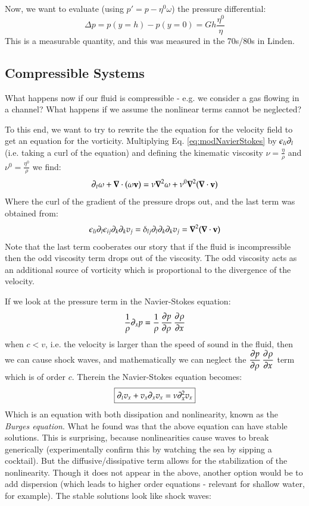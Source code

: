 Now, we want to evaluate (using $p' = p - \eta^0 \omega$) the pressure differential:
\begin{equation}
    \Delta p = p(y=h) - p(y=0) = Gh\frac{\eta^0}{\eta}
\end{equation}
This is a measurable quantity, and this was measured in the 70s/80s in Linden.

\subsection{Compressible Systems}
What happens now if our fluid is compressible - e.g. we consider a gas flowing in a channel? What happens if we assume the nonlinear terms cannot be neglected?

To this end, we want to try to rewrite the the equation for the velocity field to get an equation for the vorticity. Multiplying Eq. \eqref{eq:modNavierStokes} by $\epsilon_{li}\partial_l$ (i.e. taking a curl of the equation) and defining the kinematic viscosity $\nu = \frac{\eta}{\rho}$ and $\nu^0 = \frac{\eta^0}{\rho}$ we find:
\begin{equation}
    \p_t \omega + \nabla \cdot (\omega \v{v}) = \nu \nabla^2 \omega + \nu^0\nabla^2(\nabla \cdot \v{v})
\end{equation}
Where the curl of the gradient of the pressure drops out, and the last term was obtained from:
\begin{equation}
    \e_{li}\p_l \e_{ij}\p_k\p_k v_j = \delta_{lj}\p_l \p_k \p_k v_j = \nabla^2 (\nabla \cdot \v{v})
\end{equation}
Note that the last term cooberates our story that if the fluid is incompressible then the odd viscosity term drops out of the viscosity. The odd viscosity acts as an additional source of vorticity which is proportional to the divergence of the velocity.


If we look at the pressure term in the Navier-Stokes equation:
\begin{equation}
    \frac{1}{\rho}\p_x p = \frac{1}{\rho}\dpd{p}{\rho}\dpd{\rho}{x}
\end{equation}
when $c < v$, i.e. the velocity is larger than the speed of sound in the fluid, then we can cause shock waves, and mathematically we can neglect the $\dpd{p}{\rho}\dpd{\rho}{x}$ term which is of order $c$. Therein the Navier-Stokes equation becomes:
\begin{equation}
    \boxed{\partial_t v_x + v_x \partial_x v_x = \nu \partial_x^2 v_x}
\end{equation}
Which is an equation with both dissipation and nonlinearity, known as the \emph{Burges equation}. What he found was that the above equation can have stable solutions. This is surprising, because nonlinearities cause waves to break generically (experimentally confirm this by watching the sea by sipping a cocktail). But the diffusive/dissipative term allows for the stabilization of the nonlinearity. Though it does not appear in the above, another option would be to add dispersion (which leads to higher order equations - relevant for shallow water, for example). The stable solutions look like shock waves:

